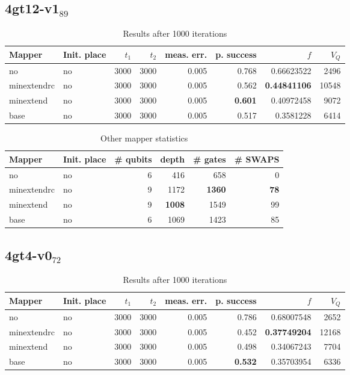 \documentclass[11pt]{article}
\begin{document}
\subsection{4gt12-v1\(_{\text{89}}\)}
\label{sec:org02b70c4}

\begin{table}[!htpb]
\caption{\label{tab:org742dea4}
Results after 1000 iterations}
\centering
\begin{tabular}{llrrrrrr}
\hline
Mapper & Init. place & \(t_1\) & \(t_2\) & meas. err. & p. success & \(f\) & \(V_Q\)\\
\hline
no & no & 3000 & 3000 & 0.005 & 0.768 & 0.66623522 & 2496\\
\hline
minextendrc & no & 3000 & 3000 & 0.005 & 0.562 & \textbf{0.44841106} & 10548\\
minextend & no & 3000 & 3000 & 0.005 & \textbf{0.601} & 0.40972458 & 9072\\
base & no & 3000 & 3000 & 0.005 & 0.517 & 0.3581228 & 6414\\
\hline
\end{tabular}
\end{table}

\begin{table}[!htpb]
\caption{\label{tab:org4e768db}
Other mapper statistics}
\centering
\small
\begin{tabular}{llrrrr}
\hline
Mapper & Init. place & \# qubits & depth & \# gates & \# SWAPS\\
\hline
no & no & 6 & 416 & 658 & 0\\
\hline
minextendrc & no & 9 & 1172 & \textbf{1360} & \textbf{78}\\
minextend & no & 9 & \textbf{1008} & 1549 & 99\\
base & no & 6 & 1069 & 1423 & 85\\
\hline
\end{tabular}
\end{table}

\subsection{4gt4-v0\(_{\text{72}}\)}
\label{sec:org5279ffb}

\begin{table}[!htpb]
\caption{\label{tab:orgf32b263}
Results after 1000 iterations}
\centering
\begin{tabular}{llrrrrrr}
\hline
Mapper & Init. place & \(t_1\) & \(t_2\) & meas. err. & p. success & \(f\) & \(V_Q\)\\
\hline
no & no & 3000 & 3000 & 0.005 & 0.786 & 0.68007548 & 2652\\
\hline
minextendrc & no & 3000 & 3000 & 0.005 & 0.452 & \textbf{0.37749204} & 12168\\
minextend & no & 3000 & 3000 & 0.005 & 0.498 & 0.34067243 & 7704\\
base & no & 3000 & 3000 & 0.005 & \textbf{0.532} & 0.35703954 & 6336\\
\hline
\end{tabular}
\end{table}
\end{document}
